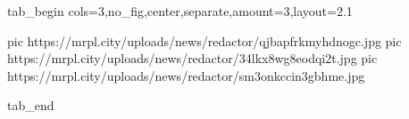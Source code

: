 
 
 
 
 


\ifcmt
  tab_begin cols=3,no_fig,center,separate,amount=3,layout=2.1

     pic https://mrpl.city/uploads/news/redactor/qjbapfrkmyhdnogc.jpg
		 pic https://mrpl.city/uploads/news/redactor/34lkx8wg8eodqi2t.jpg
		 pic https://mrpl.city/uploads/news/redactor/sm3onkccin3gbhme.jpg

  tab_end
\fi
